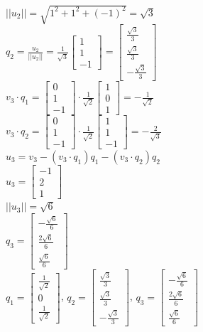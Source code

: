 \documentclass{article}
\begin{document}
{{\begin{enumerate}
\\$||u_2||=\sqrt{1^2+1^2+(-1)^2}=\sqrt{3}$
\\$q_2=\frac{u_2}{||u_2||}=\frac{1}{\sqrt{3}}\left[\begin{array}{ccc}1 \\1 \\-1\end{array} \right]=\left[\begin{array}{ccc}\frac{\sqrt{3}}{3} \\\frac{\sqrt{3}}{3} \\-\frac{\sqrt{3}}{3}\end{array} \right]$
\\$v_3\cdot q_1=\left[\begin{array}{ccc}0 \\1 \\-1\end{array} \right]\cdot \frac{1}{\sqrt{2}}\left[\begin{array}{ccc}1 \\0 \\1\end{array} \right]=-\frac{1}{\sqrt{2}}$
\\$v_3\cdot q_2=\left[\begin{array}{ccc}0 \\1 \\-1\end{array} \right]\cdot \frac{1}{\sqrt{2}}\left[\begin{array}{ccc}1 \\1 \\-1\end{array} \right]=-\frac{2}{\sqrt{3}}$
\\$u_3=v_3-(v_3\cdot q_1)q_1-(v_3\cdot q_2)q_2$
\\$u_3=\left[\begin{array}{ccc}-1 \\2 \\1\end{array} \right]$
\\$||u_3||=\sqrt{6}$
\\$q_3=\left[\begin{array}{ccc}-\frac{\sqrt{6}}{6} \\\frac{2\sqrt{6}}{6} \\\frac{\sqrt{6}}{6}\end{array} \right]$
\\$q_1=\left[\begin{array}{ccc}\frac{1}{\sqrt{2}} \\0 \\\frac{1}{\sqrt{2}}\end{array} \right]$, $q_2=\left[\begin{array}{ccc}\frac{\sqrt{3}}{3} \\\frac{\sqrt{3}}{3} \\-\frac{\sqrt{3}}{3}\end{array} \right]$, $q_3=\left[\begin{array}{ccc}-\frac{\sqrt{6}}{6} \\\frac{2\sqrt{6}}{6} \\\frac{\sqrt{6}}{6}\end{array} \right]$

\end{enumerate}}}
\end{document}
